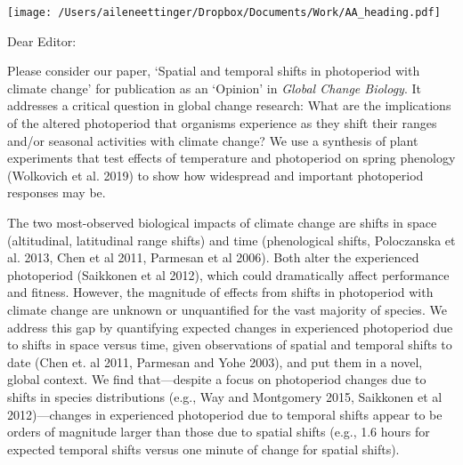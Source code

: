 \documentclass[10.7pt,a4paper]{letter} %
\begin{document}

\begin{letter}{}
\texttt{[image: /Users/aileneettinger/Dropbox/Documents/Work/AA\_heading.pdf]}

\opening{Dear Editor:}
Please consider our paper, `Spatial and temporal shifts in photoperiod with climate change' for publication as an `Opinion' in \emph{Global Change Biology}. It addresses a critical question in global change research: What are the implications of the altered photoperiod that organisms experience as they shift their ranges and/or seasonal activities with climate change? We use a synthesis of plant experiments that test effects of temperature and photoperiod on spring phenology (Wolkovich et al. 2019) to show how widespread and important photoperiod responses may be.

The two most-observed biological impacts of climate change are shifts in space (altitudinal, latitudinal range shifts) and time (phenological shifts, Poloczanska et al. 2013, Chen et al 2011, Parmesan et al 2006). Both alter the experienced photoperiod (Saikkonen et al 2012), which could dramatically affect performance and fitness. However, the magnitude of effects from shifts in photoperiod with climate change are unknown or unquantified for the vast majority of species.  We address this gap by quantifying expected changes in experienced photoperiod due to shifts in space versus time, given observations of spatial and temporal shifts to date (Chen et. al 2011, Parmesan and Yohe 2003), and put them in a novel, global context. We find that---despite a focus on photoperiod changes due to shifts in species distributions (e.g., Way and Montgomery 2015, Saikkonen et al 2012)---changes in experienced photoperiod due to temporal shifts appear to be orders of magnitude larger than those due to spatial shifts (e.g., 1.6 hours for expected temporal shifts versus one minute of change for spatial shifts). 


\end{letter}
\end{document}
